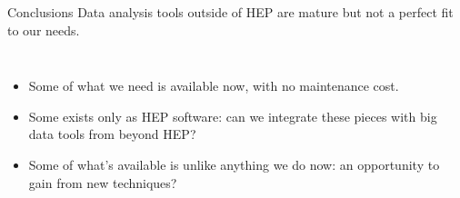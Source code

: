 \documentclass[aspectratio=169]{beamer}
\begin{document}
\begin{frame}{Conclusions}
\Large
\vspace{0.5 cm}
Data analysis tools outside of HEP are mature but not a perfect fit to our needs.

\vspace{0.25 cm}
\begin{columns}
\begin{itemize}\setlength{\itemsep}{0.25 cm}
\item Some of what we need is available now, with no maintenance cost.
\item Some exists only as HEP software: can we integrate these pieces with big data tools from beyond HEP?
\item Some of what's available is unlike anything we do now: an opportunity to gain from new techniques?
\end{itemize}
\end{columns}
\end{frame}
\end{document}
